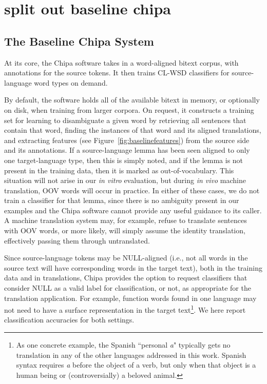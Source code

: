 \chapter{split out baseline chipa}
\label{chap:baseline}

\section{The Baseline Chipa System}
At its core, the Chipa software takes in a word-aligned bitext corpus, with
annotations for the source tokens. It then trains CL-WSD classifiers for
source-language word types on demand. 

By default, the software holds all of the available bitext in memory, or
optionally on disk, when training from larger corpora. On request, it
constructs a training set for learning to disambiguate a given word
by retrieving all sentences that contain that word,
finding the instances of that word and its aligned translations, and extracting
features (see Figure~\ref{fig:baselinefeatures}) from the source side and its
annotations.
If a source-language lemma has been seen aligned to only one target-language
type, then this is simply noted, and if the lemma is not present in the
training data, then it is marked as out-of-vocabulary. This situation will not
arise in our \emph{in vitro} evaluation, but during \emph{in vivo} machine
translation, OOV words will occur in practice.
In either of these cases, we do not train a classifier for that lemma, since
there is no ambiguity present in our examples and the Chipa software cannot
provide any useful guidance to its caller. A machine translation system may,
for example, refuse to translate sentences with OOV words, or more likely, will
simply assume the identity translation, effectively passing them through
untranslated.

Since source-language tokens may be NULL-aligned (i.e., not all words in the
source text will have corresponding words in the target text), both in the
training data and in translations, Chipa provides the option to request
classifiers that consider NULL as a valid label for classification, or not, as
appropriate for the translation application. For example, function words found
in one language may not need to have a surface representation in
the target text\footnote{As one concrete example, the Spanish ``personal
\emph{a}" typically gets no translation in any of the other languages addressed
in this work. Spanish syntax requires \emph{a} before the object of a verb,
but only when that object is a human being or (controversially) a beloved
animal.}.
We here report classification accuracies for both settings.

